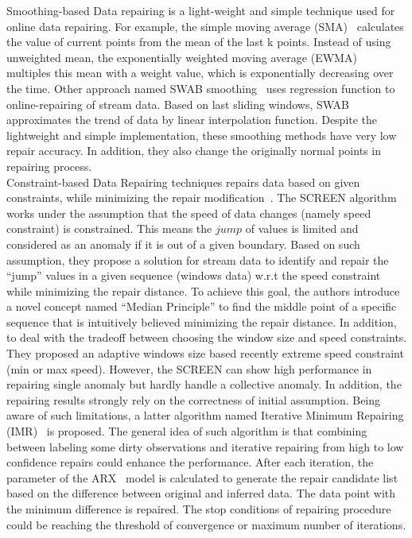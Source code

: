 Smoothing-based Data repairing is a light-weight and simple technique used for online data repairing. For example, the simple moving average (SMA)~\cite{brillinger1981time} calculates the value of current points from the mean of the last k points. Instead of using unweighted mean, the exponentially weighted moving average (EWMA)~\cite{gardner2006exponential} multiples this mean with a weight value, which is exponentially decreasing over the time. Other approach named SWAB smoothing~\cite{keogh2001online} uses regression function to online-repairing of stream data. Based on last sliding windows, SWAB approximates the trend of data by linear interpolation function. Despite the lightweight and simple implementation, these smoothing methods have very low repair accuracy. In addition, they also change the originally normal points in repairing process. \\

Constraint-based Data Repairing techniques repairs data based on given constraints, while minimizing the repair modification~\cite{bohannon2005cost}\cite{chu2013holistic}. The SCREEN algorithm~\cite{song2015screen}
works under the assumption that the speed of data changes (namely speed constraint) is constrained. This means the $jump$ of values is limited and considered as an anomaly if it is out of a given boundary. Based on such assumption, they propose a solution for stream data to identify and repair the  ``jump'' values in a given sequence (windows data) w.r.t the speed constraint while minimizing the repair distance. To achieve this goal, the authors introduce a novel concept named ``Median Principle'' to find the middle point of a specific sequence that is intuitively believed minimizing the repair distance. In addition, to deal with the tradeoff between choosing the window size and speed constraints. They proposed an adaptive windows size based recently extreme speed constraint (min or max speed). However, the SCREEN can show high performance in repairing single anomaly but hardly handle a collective anomaly. In addition, the repairing results strongly rely on the correctness of initial assumption. Being aware of such limitations, a latter algorithm named Iterative Minimum Repairing (IMR)~\cite{zhang2017time} is proposed. The general idea of such algorithm is that combining between labeling some dirty observations and iterative repairing from high to low confidence repairs could enhance the performance. After each iteration, the parameter of the ARX~\cite{park2005outlier} model is calculated to generate the repair candidate list based on the difference between original and inferred data. The data point with the minimum difference is repaired. The stop conditions of repairing procedure could be reaching the threshold of convergence or maximum number of iterations. 

